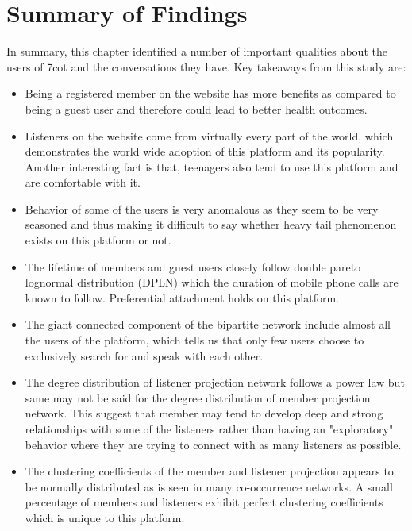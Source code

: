 \section{Summary of Findings}
In summary, this chapter identified a number of important qualities about the users of 
7cot and the conversations they have. Key takeaways from this study are: 
\begin{itemize}
\item Being a registered member on the website has more benefits as compared to being a guest user and therefore could lead to better health outcomes.
\item Listeners on the website come from virtually every part of the world, which demonstrates the world wide adoption of this platform and its popularity. Another interesting fact is that, teenagers also tend to use this platform and are comfortable with it. 
\item Behavior of some of the users is very anomalous as they seem to be very seasoned and thus making it difficult to say whether heavy tail phenomenon exists on this platform or not.
\item The lifetime of members and guest users closely follow double pareto lognormal distribution (DPLN) which the duration of mobile phone calls are known to follow. Preferential attachment holds on this platform.
\item The giant connected component of the bipartite network include almost all the users of the platform, which tells us that only few users choose to exclusively search for and speak with each other.
\item The degree distribution of listener projection network follows a power law but same may not be said for the degree distribution of member projection network. This suggest that member may tend to develop deep and strong relationships with some of the listeners rather than having an "exploratory" behavior where they are trying to connect with as many listeners as possible. 
\item The clustering coefficients of the member and listener projection appears to be normally distributed as is seen in many co-occurrence networks. A small percentage of members and listeners exhibit perfect clustering coefficients which is unique to this platform.
\end{itemize}
